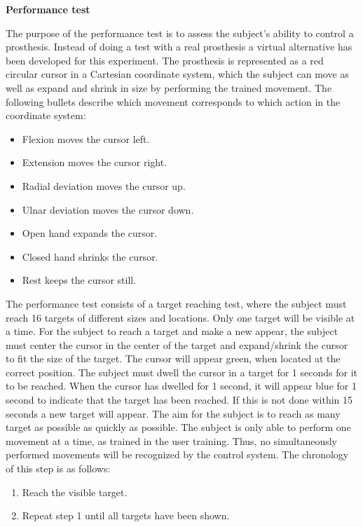 \textbf{Performance test}

The purpose of the performance test is to assess the subject's ability to control a prosthesis. Instead of doing a test with a real prosthesis a virtual alternative has been developed for this experiment. The prosthesis is represented as a red circular cursor in a Cartesian coordinate system, which the subject can move as well as expand and shrink in size by performing the trained movement. The following bullets describe which movement corresponds to which action in the coordinate system:

\begin{itemize}
	\item Flexion moves the cursor left.
	\item Extension moves the cursor right.
	\item Radial deviation moves the cursor up.
	\item Ulnar deviation moves the cursor down.
	\item Open hand expands the cursor.
	\item Closed hand shrinks the cursor.
	\item Rest keeps the cursor still.
\end{itemize}

 The performance test consists of a target reaching test, where the subject must reach 16 targets of different sizes and locations. Only one target will be visible at a time. For the subject to reach a target and make a new appear, the subject must center the cursor in the center of the target and expand/shrink the cursor to fit the size of the target. The cursor will appear green, when located at the correct position. The subject must dwell the cursor in a target for 1 seconds for it to be reached. When the cursor has dwelled for 1 second, it will appear blue for 1 second to indicate that the target has been reached. If this is not done within 15 seconds a new target will appear. The aim for the subject is to reach as many target as possible as quickly as possible. The subject is only able to perform one movement at a time, as trained in the user training. Thus, no simultaneously performed movements will be recognized by the control system. The chronology of this step is as follows:

\begin{enumerate}
	\item Reach the visible target.
	\item Repeat step 1 until all targets have been shown.
\end{enumerate}

